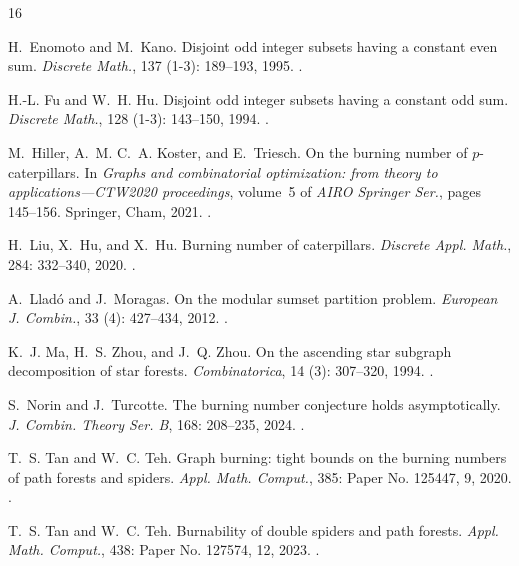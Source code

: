 \documentclass[
final
]{dmtcs-episciences}
\theoremstyle{definition}
\theoremstyle{remark}
\begin{document}
\begin{thebibliography}{16}
	
	H.~Enomoto and M.~Kano.
	\newblock Disjoint odd integer subsets having a constant even sum.
	\newblock \emph{Discrete Math.}, 137 (1-3): 189--193, 1995.
	\newblock {}.

	
	H.-L. Fu and W.~H. Hu.
	\newblock Disjoint odd integer subsets having a constant odd sum.
	\newblock \emph{Discrete Math.}, 128 (1-3): 143--150, 1994.
	\newblock {}.

	M.~Hiller, A.~M. C.~A. Koster, and E.~Triesch.
	\newblock On the burning number of {$p$}-caterpillars.
	\newblock In \emph{Graphs and combinatorial optimization: from theory to
		applications---{CTW}2020 proceedings}, volume~5 of \emph{AIRO Springer Ser.},
	pages 145--156. Springer, Cham, 2021.
	\newblock {}.

	
	H.~Liu, X.~Hu, and X.~Hu.
	\newblock Burning number of caterpillars.
	\newblock \emph{Discrete Appl. Math.}, 284: 332--340, 2020.
	\newblock {}.

	
	A.~Llad\'o and J.~Moragas.
	\newblock On the modular sumset partition problem.
	\newblock \emph{European J. Combin.}, 33 (4): 427--434, 2012.
	\newblock {}.

	
	K.~J. Ma, H.~S. Zhou, and J.~Q. Zhou.
	\newblock On the ascending star subgraph decomposition of star forests.
	\newblock \emph{Combinatorica}, 14 (3): 307--320, 1994.
	\newblock {}.

	
	S.~Norin and J.~Turcotte.
	\newblock The burning number conjecture holds asymptotically.
	\newblock \emph{J. Combin. Theory Ser. B}, 168: 208--235, 2024.
	\newblock {}.

	
	T.~S. Tan and W.~C. Teh.
	\newblock Graph burning: tight bounds on the burning numbers of path forests
	and spiders.
	\newblock \emph{Appl. Math. Comput.}, 385: Paper No. 125447, 9, 2020.
	\newblock {}.

	
	T.~S. Tan and W.~C. Teh.
	\newblock Burnability of double spiders and path forests.
	\newblock \emph{Appl. Math. Comput.}, 438: Paper No. 127574, 12, 2023.
	\newblock {}.	
\end{thebibliography}
\end{document}
